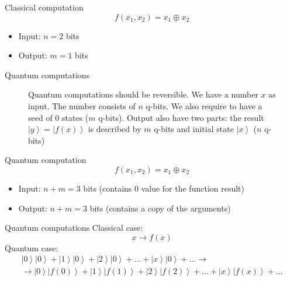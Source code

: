 \documentclass[10pt,pdf,hyperref={unicode}]{beamer}
\begin{document}
\begin{frame}{Classical computation}
  \[
  f(x_1, x_2) = x_1 \oplus x_2
  \]
  \begin{itemize}
  \item Input: $n = 2$ bits
  \item Output: $m = 1$ bits
  \end{itemize}
\end{frame}

\begin{frame}{Quantum computations}
\begin{figure}
\centering

\scalebox{.8}{}

\caption{Quantum computations should be reversible. We have a number
  $x$ as input. The number consists of $n$ q-bits. We also require to
  have a seed of $0$ states ($m$ q-bits). Output also have two parts: the result $\left|y\right> =
  \left|f\left(x\right)\right>$ is described by $m$ q-bits and initial
  state $\left|x\right>$ ($n$ q-bits)} 
\label{figQuantCompQuantComp}
\end{figure}
\end{frame}

\begin{frame}{Quantum computation}
  \[
  f(x_1, x_2) = x_1 \oplus x_2
  \]
  \begin{itemize}
  \item Input: $n + m = 3$ bits (contains 0 value for the function result)
  \item Output: $n + m = 3$ bits (contains a copy of the arguments)
  \end{itemize}
\end{frame}

\begin{frame}{Quantum computations}
Classical case:
\[
x \to f(x)
\]
Quantum case:
\begin{eqnarray}
\left|0\right>\left|0\right> + \left|1\right>\left|0\right> + \left|2\right>\left|0\right> +
\dots + \left|x\right>\left|0\right> + \dots \to
\nonumber \\
\to 
\left|0\right>\left|f(0)\right> + \left|1\right>\left|f(1)\right> + \left|2\right>\left|f(2)\right> +
\dots + \left|x\right>\left|f(x)\right> + \dots
\nonumber
\end{eqnarray}
\end{frame}
\end{document}
